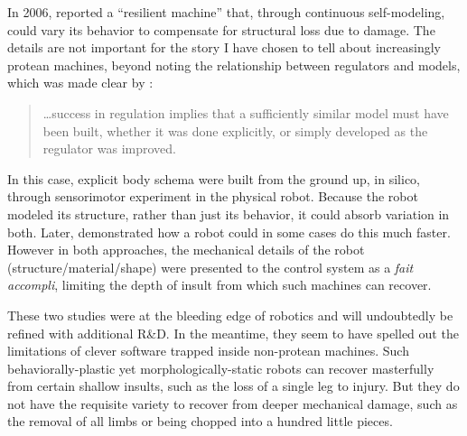 In 2006,
\citet{bongard2006resilient} reported a ``resilient machine'' that, through continuous self-modeling,
could vary its behavior to compensate for structural loss due to damage.
The details are not 
important for the story I have chosen to tell about increasingly protean machines,
beyond noting the relationship between regulators and models, which was made clear by \citet{conant1970every}:
\begin{quote}
\small
\dots success in regulation implies that a sufficiently similar model must have been built, whether it was done explicitly, or simply developed as the regulator was improved.
\end{quote}
In this case, explicit body schema were built from the ground up, in silico, through sensorimotor experiment in the physical robot.
Because the robot modeled its structure, rather than just its behavior, it could absorb variation in both.
Later, \citet{cully2015robots} demonstrated how a robot could in some cases do this much faster.
However in both approaches, the mechanical details of the robot (structure/material/shape) were presented to the control system as a \textit{fait accompli},
limiting the depth of insult 
from which such machines can recover.


These two studies were at the bleeding edge of robotics and will undoubtedly be refined with additional R\&D.
In the meantime, they seem to have spelled out the limitations of clever software trapped inside non-protean machines.
Such
behaviorally-plastic yet morphologically-static robots can recover masterfully from certain shallow insults, such as the
loss of a single leg to injury.
But they do not have the requisite variety to recover from deeper mechanical damage, such as the removal of all limbs or being chopped into a hundred little pieces.

